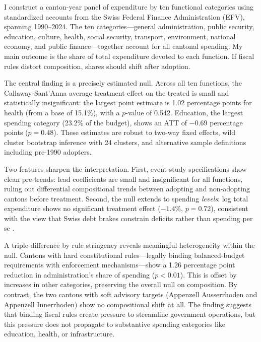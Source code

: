 \documentclass[12pt]{article}
\begin{document}
I construct a canton-year panel of expenditure by ten functional categories using standardized accounts from the Swiss Federal Finance Administration (EFV), spanning 1990--2024. The ten categories---general administration, public security, education, culture, health, social security, transport, environment, national economy, and public finance---together account for all cantonal spending. My main outcome is the share of total expenditure devoted to each function. If fiscal rules distort composition, shares should shift after adoption.

The central finding is a precisely estimated null. Across all ten functions, the Callaway-Sant'Anna average treatment effect on the treated is small and statistically insignificant: the largest point estimate is 1.02 percentage points for health (from a base of 15.1\%), with a $p$-value of 0.542. Education, the largest spending category (23.2\% of the budget), shows an ATT of $-0.69$ percentage points ($p = 0.48$). These estimates are robust to two-way fixed effects, wild cluster bootstrap inference with 24 clusters, and alternative sample definitions including pre-1990 adopters.

Two features sharpen the interpretation. First, event-study specifications show clean pre-trends: lead coefficients are small and insignificant for all functions, ruling out differential compositional trends between adopting and non-adopting cantons before treatment. Second, the null extends to spending \textit{levels}: log total expenditure shows no significant treatment effect ($-1.4\%$, $p = 0.72$), consistent with the view that Swiss debt brakes constrain deficits rather than spending per se \citep{feld2008fiscal, luechinger2013fiscal}.

A triple-difference by rule stringency reveals meaningful heterogeneity within the null. Cantons with hard constitutional rules---legally binding balanced-budget requirements with enforcement mechanisms---show a 1.26 percentage point reduction in administration's share of spending ($p < 0.01$). This is offset by increases in other categories, preserving the overall null on composition. By contrast, the two cantons with soft advisory targets (Appenzell Ausserrhoden and Appenzell Innerrhoden) show no compositional shift at all. The finding suggests that binding fiscal rules create pressure to streamline government operations, but this pressure does not propagate to substantive spending categories like education, health, or infrastructure.
\end{document}
